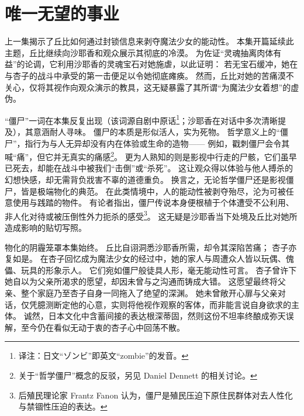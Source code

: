 \chapter[唯一无望的事业]{唯一无望的事业}



上一集揭示了丘比如何通过封锁信息来剥夺魔法少女的能动性。
本集开篇延续此主题，丘比继续向沙耶香和观众展示其彻底的冷漠。
为佐证“灵魂抽离肉体有益”的论调，它利用沙耶香的灵魂宝石对她施虐，以此证明：
若无宝石缓冲，她在与杏子的战斗中承受的第一击便足以令她彻底瘫痪。
然而，丘比对她的苦痛漠不关心，仅将其视作向观众演示的教具，这无疑暴露了其所谓“为魔法少女着想”的虚伪。

“僵尸”一词在本集反复出现（该词源自剧中原话\footnote{%
    译注：日文“ゾンビ”即英文“zombie”的发音。
}；沙耶香在对话中多次清晰提及），其意涵耐人寻味。
僵尸的本质是形似活人，实为死物。
哲学意义上的“僵尸”，指行为与人无异却没有内在体验或生命的造物——
例如，戳刺僵尸会令其喊“痛”，但它并无真实的痛感\cite{kirk-nodate-zombies}\footnote{%
    关于“哲学僵尸”概念的反驳，另见 Daniel Dennett 的相关讨论\cite{dennett1991consciousness}。
}。
更为人熟知的则是影视中行走的尸骸，它们虽早已死去，却能在战斗中被我们“击倒”或“杀死”。
这让观众得以体验与他人搏杀的幻想快感，却无需背负戕害不辜的道德重负\cite{krzywinska2008zombies-gamespace}。
换言之，无论哲学僵尸还是影视僵尸，皆是极端物化的典范。
在此类情境中，人的能动性被剥夺殆尽，沦为可被任意使用与践踏的物件。
有论者指出，僵尸传说本身便根植于个体遭受不公利用、非人化对待或被压倒性外力扼杀的感受\footnote{%
    后殖民理论家 Frantz Fanon 认为，僵尸是殖民压迫下原住民群体对去人性化与禁锢性压迫的表达。
}\cite{fanon2004wretched-earth}。
这无疑是沙耶香当下处境及丘比对她所造成影响的贴切写照。

物化的阴霾笼罩本集始终。
丘比自诩洞悉沙耶香所需，却令其深陷苦痛；
杏子亦复如是。
在杏子回忆成为魔法少女的经过中，她的家人与周遭众人皆以玩偶、傀儡、玩具的形象示人。
它们宛如僵尸般徒具人形，毫无能动性可言。
杏子曾许下她自以为父亲所渴求的愿望，却因未曾与之沟通而铸成大错。
这愿望最终将父亲、整个家庭乃至杏子自身一同拖入了绝望的深渊。
她未曾敞开心扉与父亲对话，仅凭臆测断定他的心意，实则将他视作观察的客体，而非能言说自身欲求的主体。
诚然，日本文化中含蓄间接的表达根深蒂固\cite{maynard1997global-context}，然则这份不坦率终酿成弥天误解，至今仍在看似无动于衷的杏子心中回荡不散。

